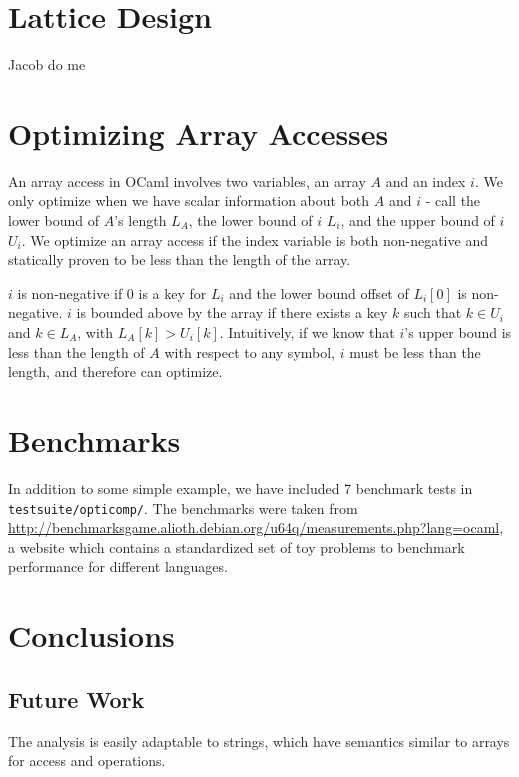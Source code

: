 \documentclass[11pt]{article}
\begin{document}
\section{Lattice Design}

Jacob do me

\section{Optimizing Array Accesses}

An array access in OCaml involves two variables, an array $A$ and an index $i$. We only optimize when we have scalar information about both $A$ and $i$ - call the lower bound of $A$'s length $L_A$, the lower bound of $i$ $L_i$, and the upper bound of $i$ $U_i$. We optimize an array access if the index variable is both non-negative and statically proven to be less than the length of the array.

$i$ is non-negative if $0$ is a key for $L_i$ and the lower bound offset of $L_i[0]$ is non-negative. $i$ is bounded above by the array if there exists a key $k$ such that $k \in U_i$ and $k \in L_A$, with $L_A[k] > U_i[k]$. Intuitively, if we know that $i$'s upper bound is less than the length of $A$ with respect to any symbol, $i$ must be less than the length, and therefore can optimize.


\section{Benchmarks}

In addition to some simple example, we have included 7 benchmark tests in \verb|testsuite/opticomp/|. The benchmarks were taken from \url{http://benchmarksgame.alioth.debian.org/u64q/measurements.php?lang=ocaml}, a website which contains a standardized set of toy problems to benchmark performance for different languages.


\section{Conclusions}



\subsection{Future Work}

The analysis is easily adaptable to strings, which have semantics similar to
arrays for access and operations. 
\end{document}
